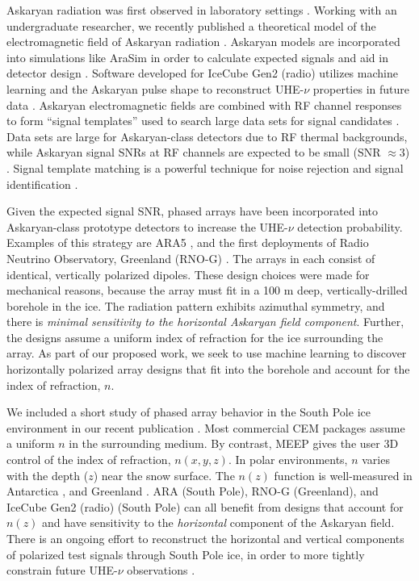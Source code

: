 \documentclass[10pt]{amsart}
\theoremstyle{definition}
\numberwithin{equation}{section}
\begin{document}
Askaryan radiation was first observed in laboratory settings \cite{saltzberg,10.1103/PhysRevD.74.043002,ask_ice}.  Working with an undergraduate researcher, we recently published a theoretical model of the electromagnetic field of Askaryan radiation \cite{PhysRevD.105.123019}. Askaryan models are incorporated into simulations like AraSim in order to calculate expected signals and aid in detector design \cite{dookayka2011characterizing,testbed,10.1140/epjc/s10052-020-7612-8}.  Software developed for IceCube Gen2 (radio) utilizes machine learning and the Askaryan pulse shape to reconstruct UHE-$\nu$ properties in future data \cite{10.1140/epjc/s10052-019-6971-5,10.1088/1748-0221/15/09/p09039,IFT}.  Askaryan electromagnetic fields are combined with RF channel responses to form ``signal templates'' used to search large data sets for signal candidates \cite{10.1088/1475-7516/2020/03/053,10.1016/j.astropartphys.2014.09.002}.  Data sets are large for Askaryan-class detectors due to RF thermal backgrounds, while  Askaryan signal SNRs at RF channels are expected to be small (SNR $\approx 3$) \cite{10.1088/1475-7516/2020/03/053,rno}.  Signal template matching is a powerful technique for noise rejection and signal identification \cite{10.1016/j.astropartphys.2015.04.002,10.1016/j.astropartphys.2014.09.002,barwick2016radio,10.1088/1475-7516/2020/03/053}. 

Given the expected signal SNR, phased arrays have been incorporated into Askaryan-class prototype detectors \cite{Vieregg_2016,AVVA201746} to increase the UHE-$\nu$ detection probability.  Examples of this strategy are ARA5 \cite{PhysRevD.105.122006}, and the first deployments of Radio Neutrino Observatory, Greenland (RNO-G) \cite{rno}.  The arrays in each consist of identical, vertically polarized dipoles.  These design choices were made for mechanical reasons, because the array must fit in a 100 m deep, vertically-drilled borehole in the ice.  The radiation pattern exhibits azimuthal symmetry, and there is \textit{minimal sensitivity to the horizontal Askaryan field component}.  Further, the designs assume a uniform index of refraction for the ice surrounding the array.  As part of our proposed work, we seek to use machine learning to discover horizontally polarized array designs that fit into the borehole and account for the index of refraction, $n$.  

We included a short study of phased array behavior in the South Pole ice environment in our recent publication \cite{electronics10040415}.  Most commercial CEM packages assume a uniform $n$ in the surrounding medium.  By contrast, MEEP gives the user 3D control of the index of refraction, $n(x,y,z)$.  In polar environments, $n$ varies with the depth ($z$) near the snow surface.  The $n(z)$ function is well-measured in Antarctica \cite{horizPaper}, and Greenland \cite{deaconu_2018}.  ARA (South Pole), RNO-G (Greenland), and IceCube Gen2 (radio) (South Pole) can all benefit from designs that account for $n(z)$ and have sensitivity to the \textit{horizontal} component of the Askaryan field. There is an ongoing effort to reconstruct the horizontal and vertical components of polarized test signals through South Pole ice, in order to more tightly constrain future UHE-$\nu$ observations \cite{10.1088/1748-0221/15/09/p09039}. 
\end{document}
